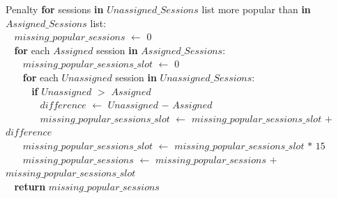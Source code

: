 \begin{tabbing}Penalty {\bf for} sessions {\bf in} $\textit{Unassigned\_Sessions}$ list more popular than {\bf in} $\textit{Assigned\_Sessions}$ list$:$\\
$~~~~$$\textit{missing\_popular\_sessions}$ $\leftarrow$ $0$\\
$~~~~${\bf for} each $\textit{Assigned}$ session {\bf in} $\textit{Assigned\_Sessions}$$:$\\
$~~~~~~~~$$\textit{missing\_popular\_sessions\_slot}$ $\leftarrow$ $0$\\
$~~~~~~~~${\bf for} each $\textit{Unassigned}$ session {\bf in} $\textit{Unassigned\_Sessions}$$:$\\
$~~~~~~~~~~~~${\bf if} $\textit{Unassigned}$ $>$ $\textit{Assigned}$\\
$~~~~~~~~~~~~~~~~$$\textit{difference}$ $\leftarrow$ $\textit{Unassigned}$ $-$ $\textit{Assigned}$\\
$~~~~~~~~~~~~~~~~$$\textit{missing\_popular\_sessions\_slot}$ $\leftarrow$ $\textit{missing\_popular\_sessions\_slot}$ $+$ $\textit{difference}$\\
$~~~~~~~~$$\textit{missing\_popular\_sessions\_slot}$ $\leftarrow$ $\textit{missing\_popular\_sessions\_slot}$ $*$ $15$\\
$~~~~~~~~$$\textit{missing\_popular\_sessions}$ $\leftarrow$ $\textit{missing\_popular\_sessions}$ $+$ $\textit{missing\_popular\_sessions\_slot}$\\
$~~~~${\bf return} $\textit{missing\_popular\_sessions}$\\
\end{tabbing}